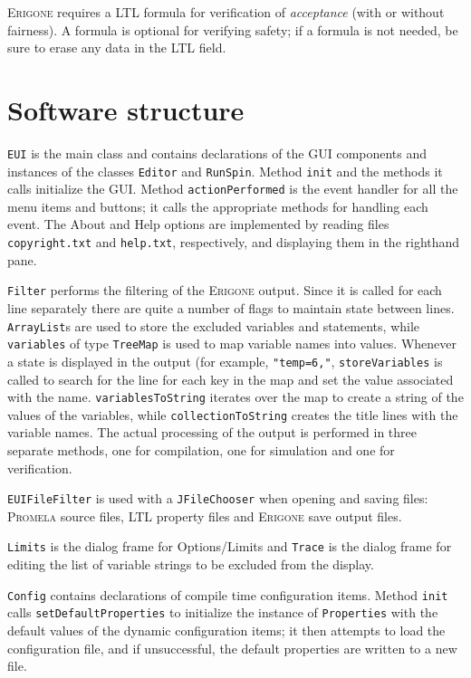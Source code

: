 \documentclass[11pt]{article}
\newcommand{\eri}{\textsc{Erigone}}
\newcommand{\prm}{\textsc{Promela}}
\newcommand{\p}[1]{\texttt{#1}}
\newcommand{\bu}[1]{\textsf{#1}}
\begin{document}
\eri{} requires a LTL formula for verification of \emph{acceptance}
(with or without fairness). A formula is optional for verifying safety;
if a formula is not needed, be sure to erase any data in the LTL field.

\newpage

\section{Software structure}

\p{EUI} is the main class and contains declarations of the GUI
components and instances of the classes \p{Editor} and \p{RunSpin}.
Method \p{init} and the methods it calls initialize the GUI. Method
\p{action\-Per\-formed} is the event handler for all the menu items and
buttons; it calls the appropriate methods for handling each event. The
\bu{About} and \bu{Help} options are implemented by reading files
\p{copyright.txt} and \p{help.txt}, respectively, and displaying them in
the righthand pane.

\p{Filter} performs the filtering of the \eri{} output. Since it is
called for each line separately there are quite a number of flags to
maintain state between lines. \p{ArrayList}s are used to store the
excluded variables and statements, while \p{variables} of type
\p{TreeMap} is used to map variable names into values. Whenever a state
is displayed in the output (for example, \p{"temp=6,"},
\p{storeVariables} is called to search for the line for each key in the
map and set the value associated with the name. \p{variablesToString}
iterates over the map to create a string of the values of the variables,
while \p{collectionToString} creates the title lines with the variable
names. The actual processing of the output is performed in three
separate methods, one for compilation, one for simulation and one for
verification.

\p{EUIFileFilter} is used with a \p{JFileChooser} when opening and
saving files: \prm{} source files, LTL property files and \eri{} save
output files.

\p{Limits} is the dialog frame for \bu{Options/Limits} and \p{Trace} is
the dialog frame for editing the list of variable strings to be excluded
from the display.

\p{Config} contains declarations of compile time configuration items.
Method \p{init} calls \p{set\-Default\-Properties} to initialize the
instance of \p{Properties} with the default values of the dynamic
configuration items; it then attempts to load the configuration file,
and if unsuccessful, the default properties are written to a new file.
\end{document}
